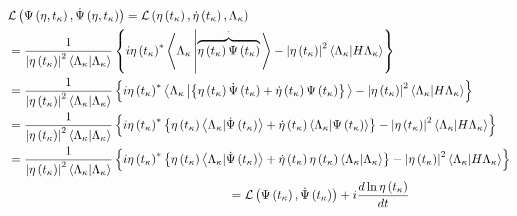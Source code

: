 \documentclass[aps,preprint]{revtex4}
\begin{document}
\begin{align}
& \mathcal{L}\left( \Psi\left( \eta,t_{\kappa}\right) ,\dot{\Psi}\left(
\eta,t_{\kappa}\right) \right) =\mathcal{L}\left( \eta\left( t_{\kappa
}\right) ,\dot{\eta}\left( t_{\kappa}\right) ,\Lambda_{\kappa}\right)  \notag
\\
& =\frac{1}{\left| \eta\left( t_{\kappa}\right) \right| ^{2}\left\langle
\Lambda_{\kappa}|\Lambda_{\kappa}\right\rangle }\left\{ i\eta\left(
t_{\kappa}\right) ^{\ast}\left\langle \Lambda_{\kappa}\left| \overset{\cdot }%
{\overbrace{\eta\left( t_{\kappa}\right) \Psi\left( t_{\kappa}\right) }}%
\right. \right\rangle -\left| \eta\left( t_{\kappa}\right) \right|
^{2}\left\langle \Lambda_{\kappa}|H\Lambda_{\kappa}\right\rangle \right\} 
\notag \\
& =\frac{1}{\left| \eta\left( t_{\kappa}\right) \right| ^{2}\left\langle
\Lambda_{\kappa}|\Lambda_{\kappa}\right\rangle }\left\{ i\eta\left(
t_{\kappa}\right) ^{\ast}\left\langle \Lambda_{\kappa}\left| \left\{
\eta\left( t_{\kappa}\right) \dot{\Psi}\left( t_{\kappa}\right) +\dot {\eta}%
\left( t_{\kappa}\right) \Psi\left( t_{\kappa}\right) \right\} \right.
\right\rangle -\left| \eta\left( t_{\kappa}\right) \right| ^{2}\left\langle
\Lambda_{\kappa}|H\Lambda_{\kappa}\right\rangle \right\}  \notag \\
& =\frac{1}{\left| \eta\left( t_{\kappa}\right) \right| ^{2}\left\langle
\Lambda_{\kappa}|\Lambda_{\kappa}\right\rangle }\left\{ i\eta\left(
t_{\kappa}\right) ^{\ast}\left\{ \eta\left( t_{\kappa}\right) \left\langle
\Lambda_{\kappa}|\dot{\Psi}\left( t_{\kappa}\right) \right\rangle +\dot {\eta%
}\left( t_{\kappa}\right) \left\langle \Lambda_{\kappa}|\Psi\left(
t_{\kappa}\right) \right\rangle \right\} -\left| \eta\left( t_{\kappa
}\right) \right| ^{2}\left\langle \Lambda_{\kappa}|H\Lambda_{\kappa
}\right\rangle \right\}  \notag \\
& =\frac{1}{\left| \eta\left( t_{\kappa}\right) \right| ^{2}\left\langle
\Lambda_{\kappa}|\Lambda_{\kappa}\right\rangle }\left\{ i\eta\left(
t_{\kappa}\right) ^{\ast}\left\{ \eta\left( t_{\kappa}\right) \left\langle
\Lambda_{\kappa}|\dot{\Psi}\left( t_{\kappa}\right) \right\rangle +\dot {\eta%
}\left( t_{\kappa}\right) \eta\left( t_{\kappa}\right) \left\langle
\Lambda_{\kappa}|\Lambda_{\kappa}\right\rangle \right\} -\left| \eta\left(
t_{\kappa}\right) \right| ^{2}\left\langle \Lambda_{\kappa}|H\Lambda
_{\kappa}\right\rangle \right\}  \notag \\
& \qquad\qquad\qquad\qquad\qquad\qquad\qquad\qquad\qquad\left. =\right. 
\mathcal{L}\left( \Psi\left( t_{\kappa}\right) ,\dot{\Psi}\left(
t_{\kappa}\right) \right) +i\frac{d\ln\eta\left( t_{\kappa}\right) }{dt}
\end{align}
\end{document}
